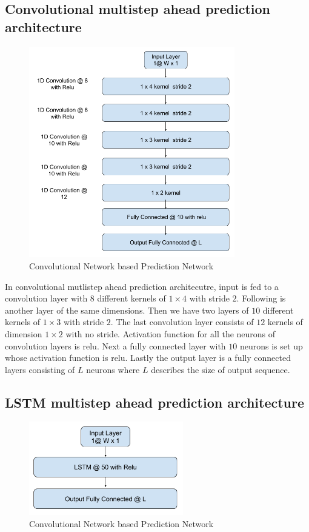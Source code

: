 \documentclass[12pt]{article}
\begin{document}
\subsection{Convolutional multistep ahead prediction architecture}
\begin{figure}[H]
\centering
        \includegraphics[width=0.8\textwidth]{images/architecture/CnnMultistepPrediction.png}
    \caption{Convolutional Network based Prediction Network}
    \label{generalAnomalyDetectionFrameWork}
\end{figure}

In convolutional mutlistep ahead prediction architecutre, input is fed to a convolution layer with $8$ different kernels of $1 \times 4$ with stride $2$. Following is another layer of the same dimensions. Then we have two layers of $10$ different kernels of $1 \times 3$ with stride $2$. The last convolution layer consists of $12$ kernels of dimension $1 \times 2$ with no stride. Activation function for all the neurons of convolution layers is relu. Next a fully connected layer with $10$ neurons is set up whose activation function is relu. Lastly the output layer is a fully connected layers consisting of $L$ neurons where $L$ describes the size of output sequence.
\subsection{LSTM multistep ahead prediction architecture}
\begin{figure}[H]
\centering
        \includegraphics[width=0.6\textwidth]{images/architecture/LstmAutoencoder.png}
    \caption{Convolutional Network based Prediction Network}
    \label{generalAnomalyDetectionFrameWork}
\end{figure}
\end{document}
